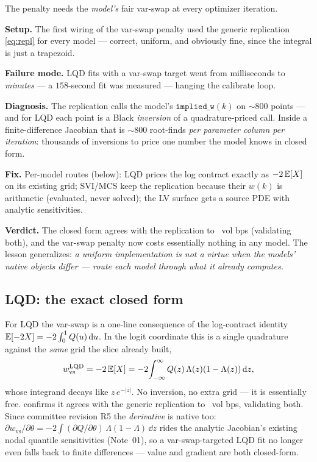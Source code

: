 \documentclass[11pt]{article}
\begin{document}
The penalty needs the \emph{model's} fair var-swap at every optimizer iteration.

\begin{example}[title={Case file: the fit that took minutes}]
\textbf{Setup.} The first wiring of the var-swap penalty used the generic
replication \eqref{eq:repl} for every model --- correct, uniform, and
obviously fine, since the integral is just a trapezoid.

\textbf{Failure mode.} LQD fits with a var-swap target went from milliseconds
to \emph{minutes} --- a $158$-second fit was measured --- hanging the
calibrate loop.

\textbf{Diagnosis.} The replication calls the model's
$\texttt{implied\_w}(k)$ on $\sim800$ points --- and for LQD each point is a
Black \emph{inversion} of a quadrature-priced call. Inside a
finite-difference Jacobian that is $\sim800$ root-finds \emph{per parameter
column per iteration}: thousands of inversions to price one number the model
knows in closed form.

\textbf{Fix.} Per-model routes (below): LQD prices the log contract exactly
as $-2\,\mathbb{E}[X]$ on its existing grid; SVI/MCS keep the replication because
their $w(k)$ is arithmetic (evaluated, never solved); the LV surface gets a
source PDE with analytic sensitivities.

\textbf{Verdict.} The closed form agrees with the replication to
\vsagreebp\ vol bps (validating both), and the var-swap penalty now costs
essentially nothing in any model. The lesson generalizes: \emph{a uniform
implementation is not a virtue when the models' native objects differ ---
route each model through what it already computes.}
\end{example}

\subsection{LQD: the exact closed form}

For LQD the var-swap is a one-line consequence of the log-contract identity
$\mathbb{E}[-2X]=-2\int_0^1 Q(u)\,\mathrm{d} u$. In the logit coordinate this is a single
quadrature against the \emph{same} grid the slice already built,
\begin{equation}
w_{\text{vs}}^{\text{LQD}}=-2\,\mathbb{E}[X]=-2\!\int_{-\infty}^{\infty}Q(z)\,\Lambda(z)(1-\Lambda(z))\,\mathrm{d} z,
\label{eq:lqd_vs}
\end{equation}
whose integrand decays like $z\,e^{-|z|}$. No inversion, no extra grid --- it is
essentially free.  confirms it agrees with the generic replication to
\vsagreebp\ vol bps, validating both. Since committee revision R5 the
\emph{derivative} is native too:
$\partial w_{\text{vs}}/\partial\theta
=-2\int(\partial Q/\partial\theta)\,\Lambda(1-\Lambda)\,\dd z$ rides the
analytic Jacobian's existing nodal quantile sensitivities (Note~01), so a
var-swap-targeted LQD fit no longer even falls back to finite differences ---
value and gradient are both closed-form.
\end{document}
